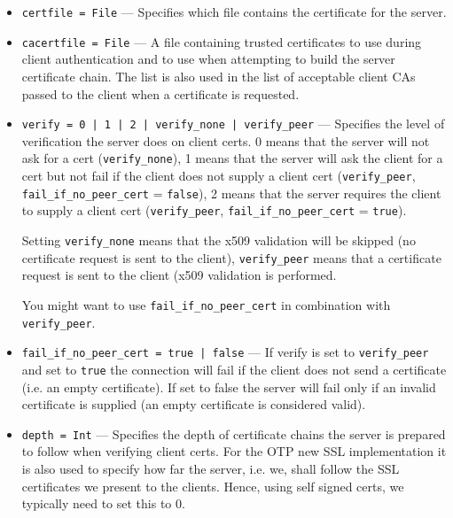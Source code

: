 \documentclass[11pt,oneside,english]{book}
\begin{document}
\begin{itemize}
\begin{itemize}
               \item \verb+certfile = File+ --- Specifies which file contains
                 the certificate for the server.

               \item \verb+cacertfile = File+ --- A file containing trusted
                 certificates to use during client authentication and to use
                 when attempting to build the server certificate chain. The list
                 is also used in the list of acceptable client CAs passed to the
                 client when a certificate is requested.

               \item \verb+verify = 0 | 1 | 2 | verify_none | verify_peer+ ---
                 Specifies the level of verification the server does on client
                 certs. 0 means that the server will not ask for a cert
                 (\verb+verify_none+), 1 means that the server will ask the
                 client for a cert but not fail if the client does not supply a
                 client cert (\verb+verify_peer+, \verb+fail_if_no_peer_cert+ =
                 \verb+false+), 2 means that the server requires the client to
                 supply a client cert (\verb+verify_peer+,
                 \verb+fail_if_no_peer_cert+ = \verb+true+).

                 Setting \verb+verify_none+ means that the x509 validation will
                 be skipped (no certificate request is sent to the client),
                 \verb+verify_peer+ means that a certificate request is sent to
                 the client (x509 validation is performed.

                 You might want to use \verb+fail_if_no_peer_cert+ in
                 combination with \verb+verify_peer+.

               \item \verb+fail_if_no_peer_cert = true | false+ --- If verify is
                 set to \verb+verify_peer+ and set to \verb+true+ the connection
                 will fail if the client does not send a certificate (i.e. an
                 empty certificate). If set to false the server will fail only
                 if an invalid certificate is supplied (an empty certificate is
                 considered valid).

               \item \verb+depth = Int+ --- Specifies the depth of certificate
                 chains the server is prepared to follow when verifying client
                 certs. For the OTP new SSL implementation it is also used to
                 specify how far the server, i.e. we, shall follow the SSL
                 certificates we present to the clients. Hence, using self
                 signed certs, we typically need to set this to 0.


\end{itemize}
\end{itemize}
\end{document}
